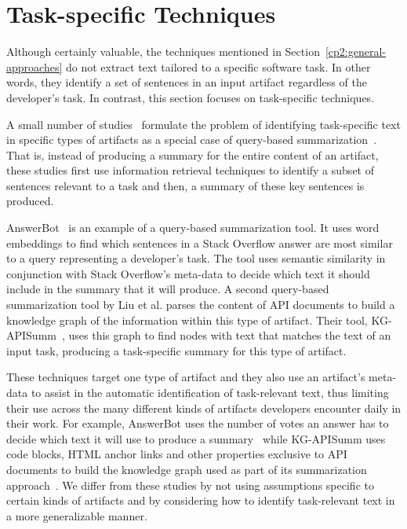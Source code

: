 



\section{Task-specific Techniques}
\label{cp2:task-approaches}



Although certainly valuable, the techniques mentioned in Section~\ref{cp2:general-approaches}
do not extract text tailored to 
a specific software task. In other words, they identify 
a set of sentences in an input artifact regardless of the developer's task. 
In contrast, this section focuses on task-specific techniques.

A small number of studies~\cite{Xu2017, silva2019, liu2019qapi} 
 formulate the problem of identifying task-specific text 
 in specific types of artifacts as 
a special case of query-based summarization~\cite{Goldsteinet1999}. That is, 
instead of producing a summary for the entire content of 
an artifact,
these studies first use information retrieval techniques
to identify a subset 
of sentences relevant to a task and then, 
a summary of these key sentences is produced.



AnswerBot~\cite{Xu2017} is an example of a query-based summarization tool.
It uses word embeddings to find which sentences in a Stack Overflow answer 
are most similar to a query representing a developer's task.
The tool uses semantic similarity in conjunction with 
Stack Overflow's meta-data to decide which text  it should include
in the summary that it will produce. 
A second query-based summarization tool by Liu et al. parses the content 
of API documents to build a knowledge graph of the information within this type of artifact. 
Their tool, KG-APISumm~\cite{liu2019qapi}, uses this graph 
to find nodes with text that matches the text of an input task, 
producing a task-specific summary for this type of artifact. 


These techniques
target one type of artifact and they also use an artifact's meta-data to 
assist in the automatic identification of task-relevant text, thus
limiting their use across the
many different kinds of artifacts developers encounter
daily in their work. 
For example, AnswerBot uses the number of votes an answer has to decide which text it will use to produce a summary~\cite{Xu2017}
while KG-APISumm uses 
code blocks, HTML anchor links and other properties exclusive to API documents to build the knowledge graph used as part of its summarization approach~\cite{liu2019qapi}.
We differ from these studies 
by not using assumptions 
specific to certain kinds of artifacts
and by considering how to identify task-relevant text 
in a more generalizable manner.





